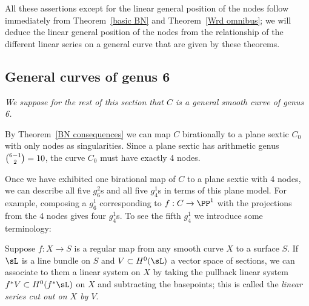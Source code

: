 All these assertions except for the linear general position of the nodes
follow immediately from
Theorem~\ref{basic BN} and
Theorem~\ref{Wrd omnibus}; we will deduce the linear general position
of the nodes from the relationship of the different
linear series on a general curve that are given by these theorems.

\subsection{General curves of genus 6}
\emph{We suppose for the rest of this section that $C$ is a general
smooth curve of genus 6.}

By Theorem~\ref{BN consequences} we can map $C$ birationally to a plane
sextic $C_0$ with only nodes as singularities. Since a plane sextic has
arithmetic genus $\tbinom{6-1}{2} = 10$, the curve $C_{0}$
must have exactly 4 nodes.

Once we have exhibited one birational map of $C$ to a plane sextic with
4 nodes, we can describe all five $g^2_6$s and all five $g^1_4$s in terms
of this plane model. For example, composing a $g^1_6$ corresponding to $f:
C\to \PP^1$ with the projections from the 4 nodes gives four $g^1_4$s. To
see the
fifth
$g^{1}_{4}$ we introduce some terminology:

Suppose $f : X \to S$ is a regular map from any smooth curve $X$ to a
surface $S$. If $\sL $ is a line bundle on $S$ and $V \subset H^0(\sL
)$ a vector space of sections, we can associate to them a linear system
on $X$ by taking the pullback linear system $f^*V \subset H^0(f^*\sL )$
on $X$ and subtracting the basepoints; this is called the
\emph{linear series cut out on $X$ by $V$}.
%

